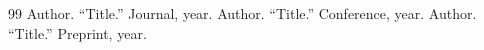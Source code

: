 \begin{thebibliography}{99}
   Author. ``Title.'' Journal, year.
   Author. ``Title.'' Conference, year.
   Author. ``Title.'' Preprint, year.
\end{thebibliography}

